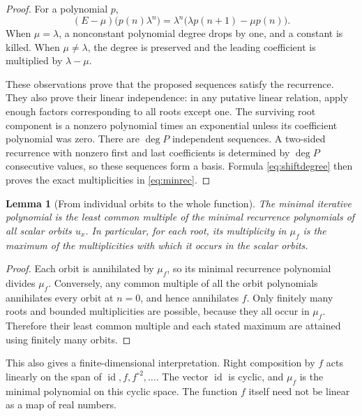 \documentclass[11pt,letterpaper]{article}
\newtheorem{lemma}[theorem]{Lemma}
\theoremstyle{definition}
\theoremstyle{remark}
\newcommand{\id}{\operatorname{id}}
\newcommand{\itn}[2]{#1^{\circ #2}}
\newcommand{\degree}{\operatorname{deg}}
\begin{document}
\begin{proof}
For a polynomial $p$,
\begin{equation}
 (E-\mu)\bigl(p(n)\lambda^n\bigr)
  =\lambda^n\bigl(\lambda p(n+1)-\mu p(n)\bigr).
 \label{eq:shiftdegree}
\end{equation}
When $\mu=\lambda$, a nonconstant polynomial degree drops by one, and a
constant is killed. When $\mu\ne\lambda$, the degree is preserved and the
leading coefficient is multiplied by $\lambda-\mu$.

These observations prove that the proposed sequences satisfy the
recurrence. They also prove their linear independence: in any putative
linear relation, apply enough factors corresponding to all roots except
one. The surviving root component is a nonzero polynomial times an
exponential unless its coefficient polynomial was zero. There are
$\degree P$ independent sequences. A two-sided recurrence with nonzero
first and last coefficients is determined by $\degree P$ consecutive
values, so these sequences form a basis. Formula \eqref{eq:shiftdegree}
then proves the exact multiplicities in \eqref{eq:minrec}.
\end{proof}

\begin{lemma}[From individual orbits to the whole function]
\label{lem:lcm}
The minimal iterative polynomial is the least common multiple of the
minimal recurrence polynomials of all scalar orbits $u_x$. In particular,
for each root, its multiplicity in $\mu_f$ is the maximum of the
multiplicities with which it occurs in the scalar orbits.
\end{lemma}

\begin{proof}
Each orbit is annihilated by $\mu_f$, so its minimal recurrence polynomial
divides $\mu_f$. Conversely, any common multiple of all the orbit
polynomials annihilates every orbit at $n=0$, and hence annihilates $f$.
Only finitely many roots and bounded multiplicities are possible, because
they all occur in $\mu_f$. Therefore their least common multiple and each
stated maximum are attained using finitely many orbits.
\end{proof}

This also gives a finite-dimensional interpretation. Right composition
by $f$ acts linearly on the span of $\id,f,\itn{f}{2},\ldots$.
The vector $\id$ is cyclic, and $\mu_f$ is the minimal polynomial on
this cyclic space. The function $f$ itself need not be linear as a map
of real numbers.
\end{document}
